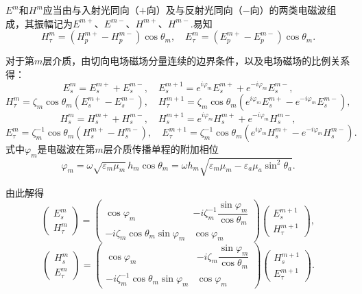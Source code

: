\(E^m\)和\(H^m\)应当由与入射光同向（\(+\)向）及与反射光同向（\(-\)向）的两类电磁波组成，其振幅记为\(E^{m+}\)、\(E^{m-}\)、\(H^{m+}\)、\(H^{m-}\).易知
\begin{equation*}
	H_\tau^m = (H_p^{m+} - H_p^{m-})\cos\theta_m,\quad E_\tau^m = (E_p^{m+} - E_p^{m-})\cos\theta_m.
\end{equation*}

对于第\(m\)层介质，由切向电场磁场分量连续的边界条件，以及电场磁场的比例关系得：
\begin{equation*}
	E_s^m = E_s^{m+} + E_s^{m-},\quad E_s^{m+1} = e^{i\varphi_m}E_s^{m+} + e^{-i\varphi_m}E_s^{m-},
\end{equation*}
\begin{equation*}
	H_\tau^m = \zeta_m\cos\theta_m(E_s^{m+} - E_s^{m-}),\quad H_\tau^{m+1} = \zeta_m\cos\theta_m(e^{i\varphi_m}E_s^{m+} - e^{-i\varphi_m}E_s^{m-}),
\end{equation*}
\begin{equation*}
	H_s^m = H_s^{m+} + H_s^{m-},\quad H_s^{m+1} = e^{i\varphi_m}H_s^{m+} + e^{-i\varphi_m}H_s^{m-},
\end{equation*}
\begin{equation*}
	E_\tau^m = \zeta_m^{-1}\cos\theta_m(H_s^{m+} - H_s^{m-}),\quad E_\tau^{m+1} = \zeta_m^{-1}\cos\theta_m(e^{i\varphi_m}H_s^{m+} - e^{-i\varphi_m}H_s^{m-}).
\end{equation*}
式中\(\varphi_m\)是电磁波在第\(m\)层介质传播单程的附加相位
\begin{equation*}
	\varphi_m = \omega\sqrt{\varepsilon_m\mu_m}\,h_m\cos\theta_m = \omega h_m\sqrt{\varepsilon_m\mu_m - \varepsilon_a\mu_a\sin^2\theta_a}.
\end{equation*}

由此解得
\begin{equation*}
	\begin{pmatrix}
		E_s^m \\
		H_\tau^m
	\end{pmatrix}
	=
	\begin{pmatrix}
		\cos\varphi_m                      & -i\zeta_m^{-1}\dfrac{\sin\varphi_m}{\cos\theta_m} \\
		-i\zeta_m\cos\theta_m\sin\varphi_m & \cos\varphi_m
	\end{pmatrix}
	\begin{pmatrix}
		E_s^{m+1} \\
		H_\tau^{m+1}
	\end{pmatrix},
\end{equation*}
\begin{equation*}
	\begin{pmatrix}
		H_s^m \\
		E_\tau^m
	\end{pmatrix}
	=
	\begin{pmatrix}
		\cos\varphi_m                           & -i\zeta_m\dfrac{\sin\varphi_m}{\cos\theta_m} \\
		-i\zeta_m^{-1}\cos\theta_m\sin\varphi_m & \cos\varphi_m
	\end{pmatrix}
	\begin{pmatrix}
		H_s^{m+1} \\
		E_\tau^{m+1}
	\end{pmatrix}.
\end{equation*}

